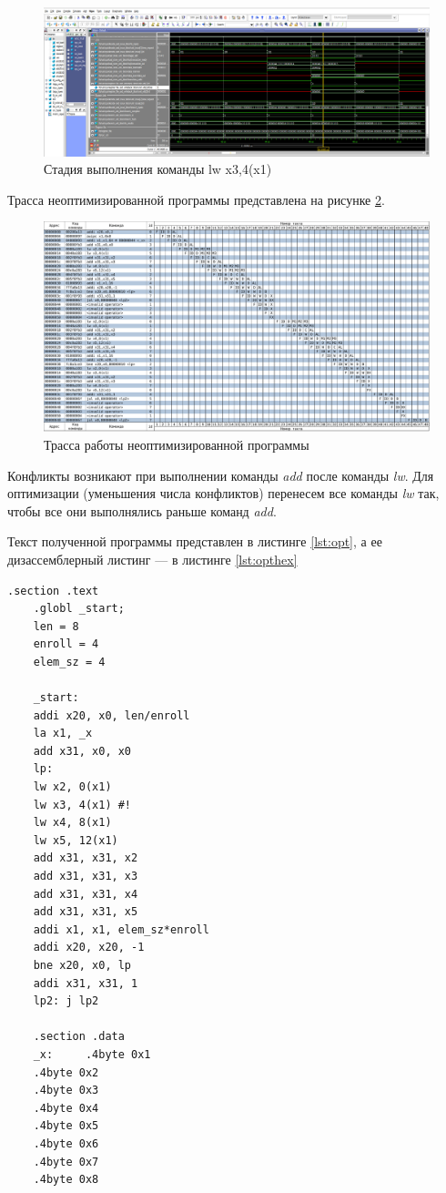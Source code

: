 \begin{figure}[h!p]
	\centering
	\includegraphics[width = \linewidth]{../img/lsu2.png}
	\caption{Стадия выполнения команды lw x3,4(x1)}
	\label{lsu2}
\end{figure}

Трасса неоптимизированной программы представлена на рисунке \ref{trace1}.

\begin{figure}[h!p]
	\centering
	\includegraphics[width = \linewidth]{../img/trace1.pdf}
	\caption{Трасса работы неоптимизированной программы}
	\label{trace1}
\end{figure}

Конфликты возникают при выполнении команды \textit{add} после команды \textit{lw}. Для оптимизации (уменьшения числа конфликтов) перенесем все команды \textit{lw} так, чтобы все они выполнялись раньше команд \textit{add}.

Текст полученной программы представлен в листинге \ref{lst:opt}, а ее дизассемблерный листинг --- в листинге \ref{lst:opthex}

\begin{lstlisting}[label=lst:opt,caption=Текст оптимизированной программы]
	.section .text
	.globl _start;
	len = 8
	enroll = 4
	elem_sz = 4
	
	_start:
	addi x20, x0, len/enroll
	la x1, _x
	add x31, x0, x0
	lp:
	lw x2, 0(x1)
	lw x3, 4(x1) #!
	lw x4, 8(x1)
	lw x5, 12(x1)
	add x31, x31, x2
	add x31, x31, x3
	add x31, x31, x4
	add x31, x31, x5
	addi x1, x1, elem_sz*enroll
	addi x20, x20, -1
	bne x20, x0, lp
	addi x31, x31, 1
	lp2: j lp2
	
	.section .data
	_x:     .4byte 0x1
	.4byte 0x2
	.4byte 0x3
	.4byte 0x4
	.4byte 0x5
	.4byte 0x6
	.4byte 0x7
	.4byte 0x8
\end{lstlisting}

